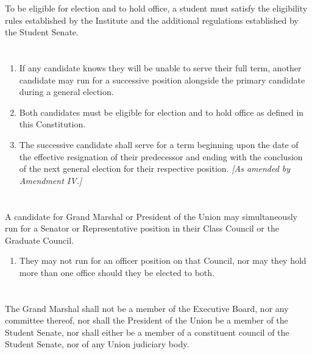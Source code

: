 \documentclass{uniondoc}
\begin{document}
To be eligible for election and to hold office, a student must satisfy the eligibility rules established by the Institute and the additional regulations established by the Student Senate.

\section{}

\begin{enumerate}
	\item If any candidate knows they will be unable to serve their full term, another candidate may run for a successive position alongside the primary candidate during a general election.
	\item Both candidates must be eligible for election and to hold office as defined in this Constitution.
	\item The successive candidate shall serve for a term beginning upon the date of the effective resignation of their predecessor and ending with the conclusion of the next general election for their respective position. \textit{[As amended by Amendment IV.]}
\end{enumerate}


\section{}

A candidate for Grand Marshal or President of the Union may simultaneously run for a Senator or Representative position in their Class Council or the Graduate Council.

\begin{enumerate}
	\item They may not run for an officer position on that Council, nor may they hold more than one office should they be elected to both.
\end{enumerate}

\section{}

The Grand Marshal shall not be a member of the Executive Board, nor any committee thereof, nor shall the President of the Union be a member of the Student Senate, nor shall either be a member of a constituent council of the Student Senate, nor of any Union judiciary body.
\end{document}
